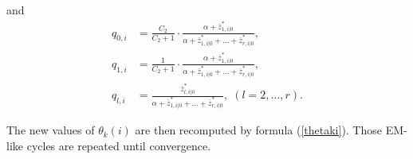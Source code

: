 \documentclass[12pt]{article}
\begin{document}
\noindent
    and
    \begin{align*}
    q_{0,i} &= \frac{C_2}{C_2+1} \cdot \frac{\alpha+\bar{z}_{1,i|0}^*}
      {\alpha + \bar{z}_{1,i|0}^* +
      \ldots + \bar{z}_{r,i|0}^*}, \\
    q_{1,i} &= \frac{1}{C_2+1} \cdot \frac{\alpha+\bar{z}_{1,i|0}^*}
      {\alpha + \bar{z}_{1,i|0}^* +
      \ldots + \bar{z}_{r,i|0}^*}, \\
    q_{l,i} &= \frac{\bar{z}_{l,i|0}^*}{\alpha + \bar{z}_{1,i|0}^* +
      \ldots + \bar{z}_{r,i|0}^*}, \; (l = 2, \ldots, r).
    \end{align*}


    The new values of $\theta_k(i)$ are then recomputed by
    formula (\ref{thetaki}). Those EM-like cycles are repeated
    until convergence.
\end{document}
